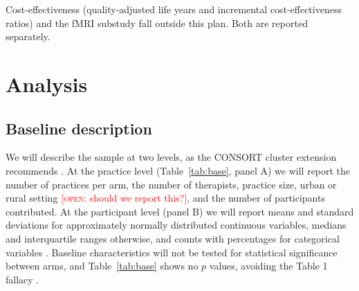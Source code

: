 \documentclass[11pt,a4paper]{article}
\newcommand{\open}[1]{\textcolor{red}{[\textsc{open}: #1]}}
\begin{document}
Cost-effectiveness (quality-adjusted life years and incremental
cost-effectiveness ratios) and the fMRI substudy fall outside this plan. Both
are reported separately.

\section{Analysis}

\subsection{Baseline description}

We will describe the sample at two levels, as the CONSORT cluster extension
recommends \citep{campbell2012}. At the practice level (Table~\ref{tab:base}, panel
A) we will report the number of practices per arm, the number of therapists,
practice size, urban or rural setting \open{should we report this?}, and the
number of participants
contributed. At the participant level (panel B) we will report means and
standard deviations for approximately normally distributed continuous
variables, medians and interquartile ranges otherwise, and counts with
percentages for categorical variables \citep{lang2015}. Baseline characteristics will not be
tested for statistical significance between arms, and Table~\ref{tab:base}
shows no $p$ values, avoiding the Table 1 fallacy
\citep{senn1994, altman1985}.
\end{document}
